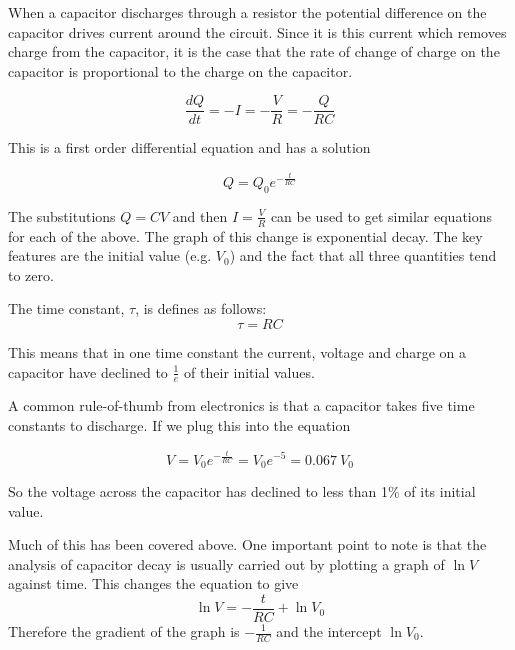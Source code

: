 \documentclass[main.tex]{subfiles}
\begin{document}

When a capacitor discharges through a resistor the potential difference on the capacitor drives current around the circuit. Since it is this current which removes charge from the capacitor, it is the case that the rate of change of charge on the capacitor is proportional to the charge on the capacitor.

\[ \frac{dQ}{dt} = -I = -\frac{V}{R} = -\frac{Q}{RC} \]

This is a first order differential equation and has a solution

\[ Q = Q_0 e^{-\frac{t}{RC}} \]

The substitutions $Q=CV$ and then $I = \frac{V}{R}$ can be used to get similar equations for each of the above. The graph of this change is exponential decay. The key features are the initial value (e.g. $V_0$) and the fact that all three quantities tend to zero.


The time constant, $\tau$, is defines as follows:
\[ \tau = RC \]

This means that in one time constant the current, voltage and charge on a capacitor have declined to $\frac{1}{e}$ of their initial values.

A common rule-of-thumb from electronics is that a capacitor takes five time constants to discharge. If we plug this into the equation

\[ V = V_0 e^{-\frac{t}{RC}} = V_0 e^{-5} = 0.067\ V_0 \]

So the voltage across the capacitor has declined to less than 1\% of its initial value.


Much of this has been covered above. One important point to note is that the analysis of capacitor decay is usually carried out by plotting a graph of $\ln{V}$ against time. This changes the equation to give
\[ \ln{V} = -\frac{t}{RC} + \ln{V_0} \]
Therefore the gradient of the graph is $-\frac{1}{RC}$ and the intercept $\ln{V_0}$.


\end{document}

